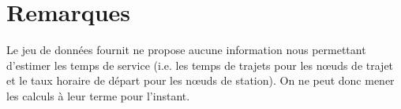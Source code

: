 \documentclass[12pt,a4paper]{article}
\begin{document}
\section{Remarques}

Le jeu de données fournit ne propose aucune information nous permettant d'estimer les temps de service (i.e. les temps de trajets pour les nœuds de trajet et le taux horaire de départ pour les nœuds de station). On ne peut donc mener les calculs à leur terme pour l'instant.

%
%
\end{document}
